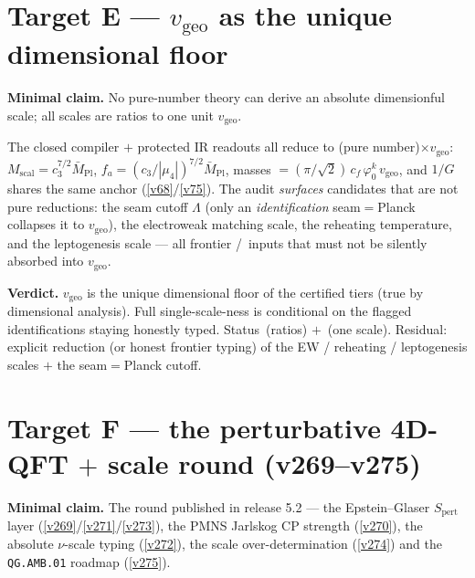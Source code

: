 \documentclass[11pt,a4paper]{article}
\newcommand{\cthree}{c_3}
\newcommand{\vgeo}{v_{\mathrm{geo}}}
\newcommand{\Mpl}{\bar M_{\mathrm{Pl}}}
\begin{document}
\section*{Target E --- $\vgeo$ as the unique dimensional floor}\label{sec:E}
\noindent\textbf{Minimal claim.} No pure-number theory can derive an absolute dimensionful scale; all
scales are ratios to one unit $\vgeo$.

\begin{keybox}
The closed compiler $+$ protected IR readouts all reduce to (pure number)$\times\vgeo$:
$M_{\mathrm{scal}}=\cthree^{7/2}\Mpl$, $f_a=(\cthree/|\mu_4|)^{7/2}\Mpl$, masses
$=(\pi/\sqrt2)\,c_f\,\varphi_0^{k}\,\vgeo$, and $1/G$ shares the same anchor (\vref{v68}/\vref{v75}). The audit
\emph{surfaces} candidates that are not pure reductions: the seam cutoff $\Lambda$ (only an
\emph{identification} seam$=$Planck collapses it to $\vgeo$), the electroweak matching scale, the
reheating temperature, and the leptogenesis scale --- all frontier \mC/\mO\ inputs that must not be
silently absorbed into $\vgeo$.
\end{keybox}

\noindent\textbf{Verdict.} $\vgeo$ is the unique dimensional floor of the certified tiers (true by
dimensional analysis). Full single-scale-ness is conditional on the flagged identifications staying
honestly typed. Status \mE\,(ratios) $+$ \mO\,(one scale). Residual: explicit reduction (or honest
frontier typing) of the EW / reheating / leptogenesis scales $+$ the seam$=$Planck cutoff.

\section*{Target F --- the perturbative 4D-QFT $+$ scale round (v269--v275)}\label{sec:F}
\noindent\textbf{Minimal claim.} The round published in release 5.2 --- the Epstein--Glaser
$S_{\mathrm{pert}}$ layer (\vref{v269}/\vref{v271}/\vref{v273}), the PMNS Jarlskog CP strength
(\vref{v270}), the absolute $\nu$-scale typing (\vref{v272}), the scale over-determination
(\vref{v274}) and the \texttt{QG.AMB.01} roadmap (\vref{v275}).
\end{document}
